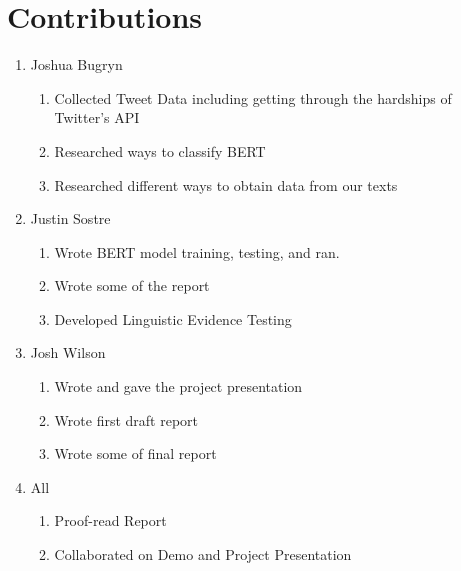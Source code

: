 \documentclass{article}
\begin{document}



\appendix

\section{Contributions}

\begin{enumerate}
    \item Joshua Bugryn
    \begin{enumerate}
        \item Collected Tweet Data including getting through the hardships of Twitter's API
        \item Researched ways to classify BERT
        \item Researched different ways to obtain data from our texts
    \end{enumerate}

    \item Justin Sostre
    \begin{enumerate}
        \item Wrote BERT model training, testing, and ran.
        \item Wrote some of the report
        \item Developed Linguistic Evidence Testing
    \end{enumerate}
    
    \item Josh Wilson
    \begin{enumerate}
        \item Wrote and gave the project presentation
        \item Wrote first draft report
        \item Wrote some of final report
    \end{enumerate}
    
    \item All
    \begin{enumerate}
        \item Proof-read Report
        \item Collaborated on Demo and Project Presentation
    \end{enumerate}
\end{enumerate}
\end{document}
